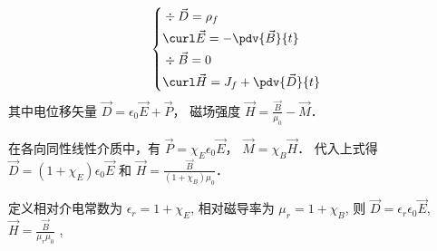 
\begin{equation}
\left\{\begin{aligned}
&\div\vec D = \rho_f\\
&\curl\vec E = -\pdv{\vec B}{t}\\
&\div\vec B = 0\\
&\curl\vec H = J_f + \pdv{\vec D}{t}
\end{aligned} \right.
\end{equation}
其中电位移矢量 $\vec D = {\epsilon _0}\vec E + \vec P$，  磁场强度 $\vec H = \frac{\vec B}{\mu _0} - \vec M$．

在各向同性线性介质中，有 $\vec P = {\chi _E}{\epsilon _0}\vec E$，  $\vec M = {\chi _B}\vec H$．  代入上式得 $\vec D = (1 + \chi _E)\epsilon _0\vec E$
  和  $\vec H = \frac{\vec B}{(1 + \chi _B)\mu_0}$． 

定义相对介电常数为 $\epsilon _r = 1 + \chi _E$, 相对磁导率为 $\mu _r = 1 + \chi _B$, 则 $\vec D = \epsilon _r\epsilon _0\vec E$, $\vec H = \frac{\vec B}{\mu _r\mu _0}$
 ,  
